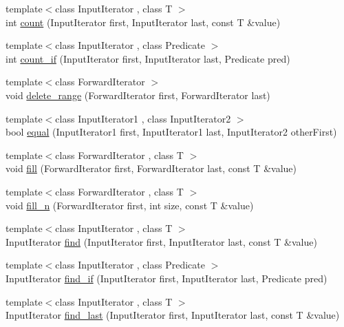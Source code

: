 \begin{DoxyCompactItemize}
\item 
{\footnotesize template$<$class Input\+Iterator , class T $>$ }\\int \hyperlink{namespaceprism_a024117fc3639cdf6598509edf22f034a}{count} (Input\+Iterator first, Input\+Iterator last, const T \&value)
\item 
{\footnotesize template$<$class Input\+Iterator , class Predicate $>$ }\\int \hyperlink{namespaceprism_af0007d361beae18a930b6249752e509e}{count\+\_\+if} (Input\+Iterator first, Input\+Iterator last, Predicate pred)
\item 
{\footnotesize template$<$class Forward\+Iterator $>$ }\\void \hyperlink{namespaceprism_a83e62e5b148c55f949e5ea843d53ad67}{delete\+\_\+range} (Forward\+Iterator first, Forward\+Iterator last)
\item 
{\footnotesize template$<$class Input\+Iterator1 , class Input\+Iterator2 $>$ }\\bool \hyperlink{namespaceprism_ad3bede9a0f2c648e93677b14c45b1b7b}{equal} (Input\+Iterator1 first, Input\+Iterator1 last, Input\+Iterator2 other\+First)
\item 
{\footnotesize template$<$class Forward\+Iterator , class T $>$ }\\void \hyperlink{namespaceprism_a7c33653a5b4a07b31f5bde15e9085b45}{fill} (Forward\+Iterator first, Forward\+Iterator last, const T \&value)
\item 
{\footnotesize template$<$class Forward\+Iterator , class T $>$ }\\void \hyperlink{namespaceprism_aceb4b9c511a5edb706296b457427b226}{fill\+\_\+n} (Forward\+Iterator first, int size, const T \&value)
\item 
{\footnotesize template$<$class Input\+Iterator , class T $>$ }\\Input\+Iterator \hyperlink{namespaceprism_a1b543d9c2862a539cc8b770abda87561}{find} (Input\+Iterator first, Input\+Iterator last, const T \&value)
\item 
{\footnotesize template$<$class Input\+Iterator , class Predicate $>$ }\\Input\+Iterator \hyperlink{namespaceprism_aa17e9e6c80f8a52479a52450a108a636}{find\+\_\+if} (Input\+Iterator first, Input\+Iterator last, Predicate pred)
\item 
{\footnotesize template$<$class Input\+Iterator , class T $>$ }\\Input\+Iterator \hyperlink{namespaceprism_a3189014b9fa31e0ef0d1933c6f616618}{find\+\_\+last} (Input\+Iterator first, Input\+Iterator last, const T \&value)

\end{DoxyCompactItemize}
